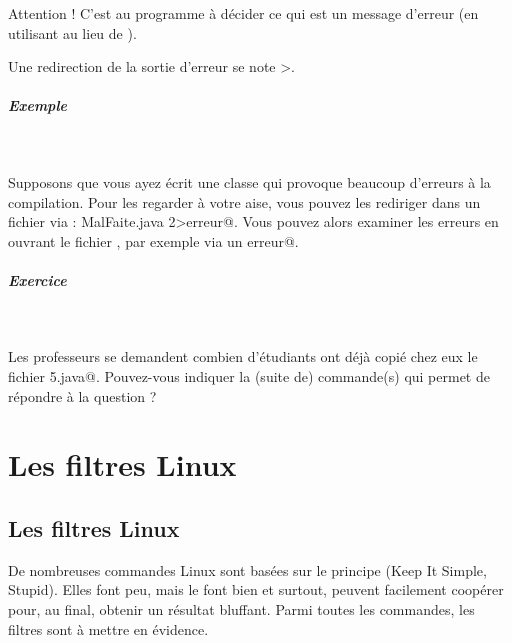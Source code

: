 \documentclass[11pt,a4paper]{article}
\begin{document}
            \par
        
					Attention !
					C'est au programme \`a d\'ecider ce qui 
					est un message d'erreur (en utilisant
					\verb@err@
					au lieu de \verb@out@).
				
            \par
        
			\begin{boxedminipage}[h]{\linewidth}
		
					Une redirection de la sortie d'erreur se note >\guillemotright .
				
			\end{boxedminipage}

			
		\subparagraph{Exemple} 
		
					\textcolor{white}{.} \par
				
            \par
        
					Supposons que vous ayez \'ecrit une classe
					\verb@Malfaite@ 
					qui provoque beaucoup d'erreurs \`a la compilation.
					Pour les regarder \`a votre aise,
					vous pouvez les rediriger dans un fichier 
					\verb@erreur@ via :
					\verb@javac MalFaite.java 2>erreur@.
					Vous pouvez alors examiner les erreurs en
					ouvrant le fichier \verb@erreur@,
					par exemple via un 
					\verb@more erreur@.
				
            \par
        
			
		\subparagraph{Exercice} 
		
					\textcolor{white}{.} \par
				
            \par
        
					Les professeurs se demandent combien
					d'\'etudiants ont d\'ej\`a copi\'e chez eux
					le fichier 
					\verb@Multiple5.java@.
					Pouvez-vous indiquer la (suite de) commande(s)
					qui permet de r\'epondre \`a la question ?
				
            \par
        \section{Les filtres Linux}\subsection{Les filtres Linux}
					De nombreuses commandes Linux
					sont bas\'ees sur le principe 
					\verb@KISS@
					(Keep It Simple, Stupid).
					Elles font peu,
					mais le font bien
					et surtout,
					peuvent facilement coop\'erer
					pour, au final,
					obtenir un r\'esultat bluffant.
					Parmi toutes les commandes,
					les filtres sont \`a mettre en \'evidence.
				
\end{document}
